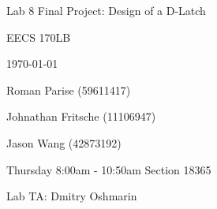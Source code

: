 \centering
\vspace{2.5cm}
{\huge Lab 8 Final Project: Design of a D-Latch \par}
{\Large EECS 170LB \par}
{\Large \today \par}
\vspace{1cm}
{\large Roman Parise (59611417) \par}
{\large Johnathan Fritsche (11106947) \par}
{\large Jason Wang (42873192) \par}
{\large \par}
\vspace{1cm}
{\large Thursday 8:00am - 10:50am Section 18365 \par}
{\large Lab TA: Dmitry Oshmarin \par}
\vspace{1cm}
